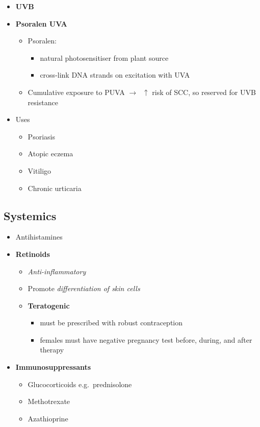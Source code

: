 \documentclass[
  12pt,
]{memoir}
\providecommand{\tightlist}{%
  \setlength{\itemsep}{0pt}\setlength{\parskip}{0pt}}
\begin{document}
\begin{itemize}
\tightlist
\item
  \textbf{UVB}
\item
  \textbf{Psoralen UVA}

  \begin{itemize}
  \tightlist
  \item
    Psoralen:

    \begin{itemize}
    \tightlist
    \item
      natural photosensitiser from plant source
    \item
      cross-link DNA strands on excitation with UVA
    \end{itemize}
  \item
    Cumulative exposure to PUVA \(\rightarrow\;\;\uparrow\) risk of SCC,
    so reserved for UVB resistance
  \end{itemize}
\item
  Uses

  \begin{itemize}
  \tightlist
  \item
    Psoriasis
  \item
    Atopic eczema
  \item
    Vitiligo
  \item
    Chronic urticaria
  \end{itemize}
\end{itemize}

\hypertarget{systemics}{%
\subsection{Systemics}\label{systemics}}

\begin{itemize}
\tightlist
\item
  Antihistamines
\item
  \textbf{Retinoids}

  \begin{itemize}
  \tightlist
  \item
    \emph{Anti-inflammatory}
  \item
    Promote \emph{differentiation of skin cells}
  \item
    \textbf{Teratogenic}

    \begin{itemize}
    \tightlist
    \item
      must be prescribed with robust contraception
    \item
      females must have negative pregnancy test before, during, and
      after therapy
    \end{itemize}
  \end{itemize}
\item
  \textbf{Immunosuppressants}

  \begin{itemize}
  \tightlist
  \item
    Glucocorticoids e.g.~prednisolone
  \item
    Methotrexate
  \item
    Azathioprine
  \end{itemize}
\end{itemize}
\end{document}
